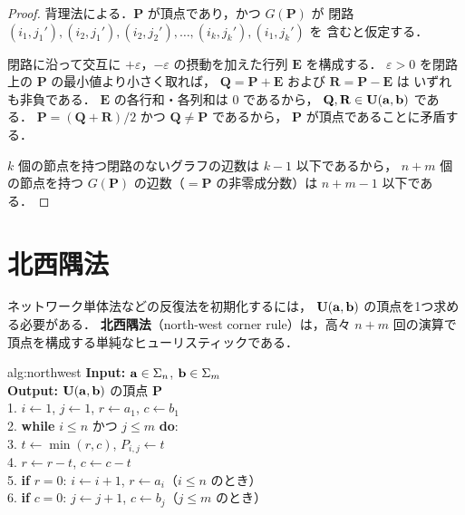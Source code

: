 \begin{proof}
  背理法による．$\mathbf{P}$ が頂点であり，かつ $G(\mathbf{P})$ が
  閉路 $(i_1, j_1'), (i_2, j_1'), (i_2, j_2'), \ldots, (i_k, j_k'), (i_1, j_k')$ を
  含むと仮定する．

  閉路に沿って交互に $+\varepsilon$，$-\varepsilon$ の摂動を加えた行列
  $\mathbf{E}$ を構成する．
  $\varepsilon > 0$ を閉路上の $\mathbf{P}$ の最小値より小さく取れば，
  $\mathbf{Q} = \mathbf{P} + \mathbf{E}$ および $\mathbf{R} = \mathbf{P} - \mathbf{E}$ は
  いずれも非負である．
  $\mathbf{E}$ の各行和・各列和は $0$ であるから，
  $\mathbf{Q}, \mathbf{R} \in \mathbf{U}(\mathbf{a}, \mathbf{b})$ である．
  $\mathbf{P} = (\mathbf{Q} + \mathbf{R}) / 2$ かつ $\mathbf{Q} \neq \mathbf{P}$ であるから，
  $\mathbf{P}$ が頂点であることに矛盾する．

  $k$ 個の節点を持つ閉路のないグラフの辺数は $k - 1$ 以下であるから，
  $n + m$ 個の節点を持つ $G(\mathbf{P})$ の辺数（$= \mathbf{P}$ の非零成分数）は
  $n + m - 1$ 以下である．
\end{proof}

\section{北西隅法}
\label{sec:northwest}

ネットワーク単体法などの反復法を初期化するには，
$\mathbf{U}(\mathbf{a}, \mathbf{b})$ の頂点を1つ求める必要がある．
\textbf{北西隅法}（north-west corner rule）は，高々 $n + m$ 回の演算で
頂点を構成する単純なヒューリスティックである．

\begin{algorithm}{alg:northwest}
  \textbf{Input:} $\mathbf{a} \in \Sigma_n$, $\mathbf{b} \in \Sigma_m$ \\
  \textbf{Output:} $\mathbf{U}(\mathbf{a}, \mathbf{b})$ の頂点 $\mathbf{P}$ \\[4pt]
  1. $i \leftarrow 1$, $j \leftarrow 1$, $r \leftarrow a_1$, $c \leftarrow b_1$ \\
  2. \textbf{while} $i \leq n$ かつ $j \leq m$ \textbf{do}: \\
  3. \quad $t \leftarrow \min(r, c)$, \quad $P_{i,j} \leftarrow t$ \\
  4. \quad $r \leftarrow r - t$, \quad $c \leftarrow c - t$ \\
  5. \quad \textbf{if} $r = 0$: $i \leftarrow i + 1$, $r \leftarrow a_i$（$i \leq n$ のとき） \\
  6. \quad \textbf{if} $c = 0$: $j \leftarrow j + 1$, $c \leftarrow b_j$（$j \leq m$ のとき）
\end{algorithm}

